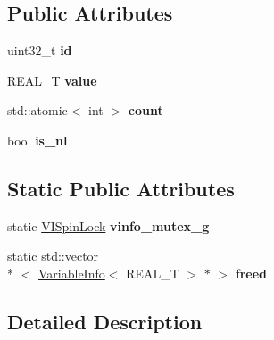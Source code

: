 \subsection*{Public Attributes}
\begin{DoxyCompactItemize}
\item 
\hypertarget{structatl_1_1_variable_info_aadade5932657ba248160121ac6095e7b}{uint32\+\_\+t {\bfseries id}}\label{structatl_1_1_variable_info_aadade5932657ba248160121ac6095e7b}

\item 
\hypertarget{structatl_1_1_variable_info_afd69857ca2e02bed5f072bfc6c2f21d4}{R\+E\+A\+L\+\_\+\+T {\bfseries value}}\label{structatl_1_1_variable_info_afd69857ca2e02bed5f072bfc6c2f21d4}

\item 
\hypertarget{structatl_1_1_variable_info_abe9f91ea1ecaad3a85d4db73b57785fd}{std\+::atomic$<$ int $>$ {\bfseries count}}\label{structatl_1_1_variable_info_abe9f91ea1ecaad3a85d4db73b57785fd}

\item 
\hypertarget{structatl_1_1_variable_info_a914fb61e91050d8d1b5a491790fe5279}{bool {\bfseries is\+\_\+nl}}\label{structatl_1_1_variable_info_a914fb61e91050d8d1b5a491790fe5279}

\end{DoxyCompactItemize}
\subsection*{Static Public Attributes}
\begin{DoxyCompactItemize}
\item 
\hypertarget{structatl_1_1_variable_info_ac92c477727be618756f034e3581fe8bc}{static \hyperlink{classatl_1_1_variable_info_1_1_v_i_spin_lock}{V\+I\+Spin\+Lock} {\bfseries vinfo\+\_\+mutex\+\_\+g}}\label{structatl_1_1_variable_info_ac92c477727be618756f034e3581fe8bc}

\item 
\hypertarget{structatl_1_1_variable_info_a9a2a895dd927378c6488e7a1de84d703}{static std\+::vector\\*
$<$ \hyperlink{structatl_1_1_variable_info}{Variable\+Info}$<$ R\+E\+A\+L\+\_\+\+T $>$ $\ast$ $>$ {\bfseries freed}}\label{structatl_1_1_variable_info_a9a2a895dd927378c6488e7a1de84d703}

\end{DoxyCompactItemize}


\subsection{Detailed Description}
